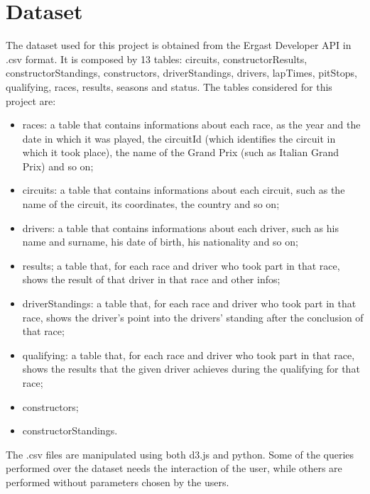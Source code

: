 \documentclass[10pt,twocolumn,letterpaper]{article}
\begin{document}
\section{Dataset}
The dataset used for this project is obtained from the Ergast Developer API \cite{Dataset} in .csv format. It is composed by 13 tables: circuits,
constructorResults, constructorStandings, constructors, driverStandings, drivers, lapTimes, pitStops, qualifying, races, results, seasons and status. The tables considered
for this project are:
\begin{itemize}
	\item races: a table that contains informations about each race, as the year and the date in which it was played, the circuitId (which identifies the circuit in which it took place), the name of the Grand Prix (such as Italian Grand Prix) and so on;
	\item circuits: a table that contains informations about each circuit, such as the name of the circuit, its coordinates, the country and so on;
	\item drivers: a table that contains informations about each driver, such as his name and surname, his date of birth, his nationality and so on;
	\item results; a table that, for each race and driver who took part in that race, shows the result of that driver in that race and other infos;
	\item driverStandings: a table that, for each race and driver who took part in that race, shows the driver's point into the drivers' standing after the conclusion of that
	race;
	\item qualifying: a table that, for each race and driver who took part in that race, shows the results that the given driver achieves during the qualifying for that race;
	\item constructors;
	\item constructorStandings. 
\end{itemize}
The .csv files are manipulated using both d3.js and python. Some of the queries performed over the dataset needs the interaction of the user, while others are performed
without parameters chosen by the users.
\end{document}
